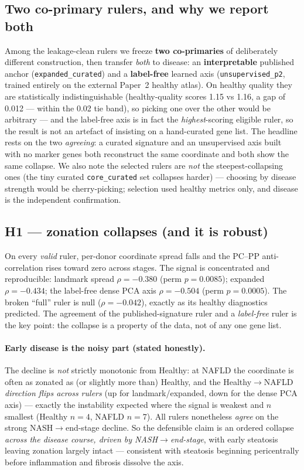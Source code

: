 \documentclass[11pt]{article}
\begin{document}
\subsection{Two co-primary rulers, and why we report both}
Among the leakage-clean rulers we freeze \textbf{two co-primaries} of deliberately different
construction, then transfer \emph{both} to disease: an \textbf{interpretable} published anchor
(\texttt{expanded\_curated}) and a \textbf{label-free} learned axis (\texttt{unsupervised\_p2}, trained entirely on the external
Paper~2 healthy atlas). On healthy quality they are statistically indistinguishable
(healthy-quality scores 1.15 vs 1.16, a gap of 0.012 --- within the 0.02 tie band), so picking one over the other would be arbitrary --- and the label-free axis is in
fact the \emph{highest}-scoring eligible ruler, so the result is not an artefact of insisting on a
hand-curated gene list. The headline rests on the two \emph{agreeing}: a curated signature and an
unsupervised axis built with no marker genes both reconstruct the same coordinate and both show the
same collapse. We also note the selected rulers are \emph{not} the steepest-collapsing ones (the
tiny curated \texttt{core\_curated} set collapses harder) --- choosing by disease strength would be
cherry-picking; selection used healthy metrics only, and disease is the independent confirmation.

\subsection{H1 --- zonation collapses (and it is robust)}
On every \emph{valid} ruler, per-donor coordinate spread falls and the PC--PP anti-correlation
rises toward zero across stages. The signal is concentrated and reproducible:
landmark spread $\rho=-0.380$ (perm $p=0.0085$); expanded $\rho=-0.434$; the label-free dense
PCA axis $\rho=-0.504$ (perm $p=0.0005$). The broken ``full'' ruler is null ($\rho=-0.042$),
exactly as its healthy diagnostics predicted. The agreement of the published-signature ruler and a
\emph{label-free} ruler is the key point: the collapse is a property of the data, not of any one
gene list.

\paragraph{Early disease is the noisy part (stated honestly).} The decline is \emph{not} strictly
monotonic from Healthy: at NAFLD the coordinate is often as zonated as (or slightly more than)
Healthy, and the Healthy$\to$NAFLD \emph{direction flips across rulers} (up for landmark/expanded,
down for the dense PCA axis) --- exactly the instability expected where the signal is weakest and $n$
smallest (Healthy $n=4$, NAFLD $n=7$). All rulers nonetheless \emph{agree} on the strong
NASH$\to$end-stage decline. So the defensible claim is an ordered collapse \emph{across the disease
course, driven by NASH$\to$end-stage}, with early steatosis leaving zonation largely intact ---
consistent with steatosis beginning pericentrally before inflammation and fibrosis dissolve the axis.
\end{document}
